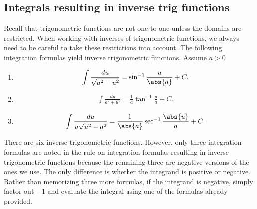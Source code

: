 \documentclass{report}
\begin{document}
    \subsection{Integrals resulting in inverse trig functions}
    \bigbreak \noindent 
    Recall that trigonometric functions are not one-to-one unless the domains are restricted. When working with inverses of trigonometric functions, we always need to be careful to take these restrictions into account.
        \bigbreak \noindent 
    The following integration formulas yield inverse trigonometric functions. Assume  $a>0$
    \begin{enumerate}
        \item \begin{align*}
                \int \frac{du}{\sqrt{a^{2}-u^{2}}} = \sin^{-1}{\frac{u}{\abs{a}}} + C
        .\end{align*}
    \item \begin{align*}
        \int \frac{du}{a^{2}+u^{2}} = \frac{1}{a}\tan^{-1}{\frac{u}{a}} + C
    .\end{align*}
    \item \begin{align*}
            \int \frac{du}{u\sqrt{u^{2}-a^{2}}} = \frac{1}{\abs{a}}\sec^{-1}{\frac{\abs{u}}{a}} + C
    .\end{align*}
    \end{enumerate}
        \bigbreak \noindent 
    There are six inverse trigonometric functions. However, only three integration formulas are noted in the rule on integration formulas resulting in inverse trigonometric functions because the remaining three are negative versions of the ones we use. The only difference is whether the integrand is positive or negative. Rather than memorizing three more formulas, if the integrand is negative, simply factor out −1 and evaluate the integral using one of the formulas already provided. 


    
\end{document}
